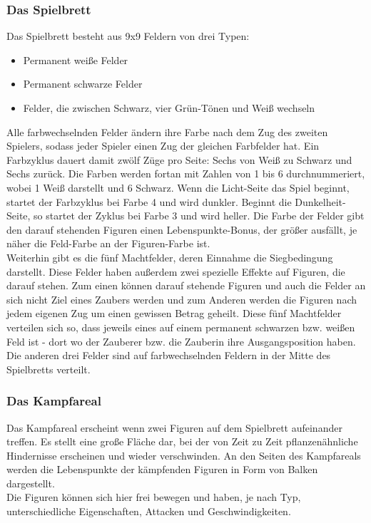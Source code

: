 \subsubsection{Das Spielbrett}
Das Spielbrett besteht aus 9x9 Feldern von drei Typen: 
\begin{itemize}
	\item Permanent weiße Felder
	\item Permanent schwarze Felder
	\item Felder, die zwischen Schwarz, vier Grün-Tönen und Weiß wechseln
\end{itemize}
Alle farbwechselnden Felder ändern ihre Farbe nach dem Zug des zweiten Spielers, sodass jeder Spieler einen Zug der gleichen Farbfelder hat. Ein Farbzyklus dauert damit zwölf Züge pro Seite: Sechs von Weiß zu Schwarz und Sechs zurück.
Die Farben werden fortan mit Zahlen von 1 bis 6 durchnummeriert, wobei 1 Weiß darstellt und 6 Schwarz.
Wenn die Licht-Seite das Spiel beginnt, startet der Farbzyklus bei Farbe 4 und wird dunkler. Beginnt die Dunkelheit-Seite, so startet der Zyklus bei Farbe 3 und wird heller. Die Farbe der Felder gibt den darauf stehenden Figuren einen Lebenspunkte-Bonus, der größer ausfällt, je näher die Feld-Farbe an der Figuren-Farbe ist.\\
Weiterhin gibt es die fünf Machtfelder, deren Einnahme die Siegbedingung darstellt. Diese Felder haben außerdem zwei spezielle Effekte auf Figuren, die darauf stehen. Zum einen können darauf stehende Figuren und auch die Felder an sich nicht Ziel eines Zaubers werden und zum Anderen werden die Figuren nach jedem eigenen Zug um einen gewissen Betrag geheilt. Diese fünf Machtfelder verteilen sich so, dass jeweils eines auf einem permanent schwarzen bzw. weißen Feld ist - dort wo der Zauberer bzw. die Zauberin ihre Ausgangsposition haben. Die anderen drei Felder sind auf farbwechselnden Feldern in der Mitte des Spielbretts verteilt.

\subsubsection{Das Kampfareal}
Das Kampfareal erscheint wenn zwei Figuren auf dem Spielbrett aufeinander treffen. Es stellt eine große Fläche dar, bei der von Zeit zu Zeit pflanzenähnliche Hindernisse erscheinen und wieder verschwinden. An den Seiten des Kampfareals werden die Lebenspunkte der kämpfenden Figuren in Form von Balken dargestellt.\\
Die Figuren können sich hier frei bewegen und haben, je nach Typ, unterschiedliche Eigenschaften, Attacken und Geschwindigkeiten.

